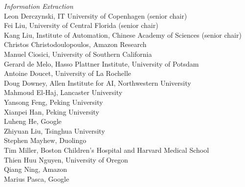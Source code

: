 \emph{Information Extraction} \\
\hspace*{0.2in} Leon Derczynski, IT University of Copenhagen (senior chair)\\
\hspace*{0.2in} Fei Liu, University of Central Florida (senior chair)\\
\hspace*{0.2in} Kang Liu, Institute of Automation, Chinese Academy of Sciences (senior chair)\\
\hspace*{0.2in} Christos Christodoulopoulos, Amazon Research\\
\hspace*{0.2in} Manuel Ciosici, University of Southern California\\
\hspace*{0.2in} Gerard de Melo, Hasso Plattner Institute, University of Potsdam\\
\hspace*{0.2in} Antoine Doucet, University of La Rochelle\\
\hspace*{0.2in} Doug Downey, Allen Institute for AI, Northwestern University\\
\hspace*{0.2in} Mahmoud El-Haj, Lancaster University\\
\hspace*{0.2in} Yansong Feng, Peking University\\
\hspace*{0.2in} Xianpei Han, Peking University\\
\hspace*{0.2in} Luheng He, Google\\
\hspace*{0.2in} Zhiyuan Liu, Tsinghua University\\
\hspace*{0.2in} Stephen Mayhew, Duolingo\\
\hspace*{0.2in} Tim Miller, Boston Children's Hospital and Harvard Medical School\\
\hspace*{0.2in} Thien Huu Nguyen, University of Oregon\\
\hspace*{0.2in} Qiang Ning, Amazon\\
\hspace*{0.2in} Marius Pasca, Google\\
